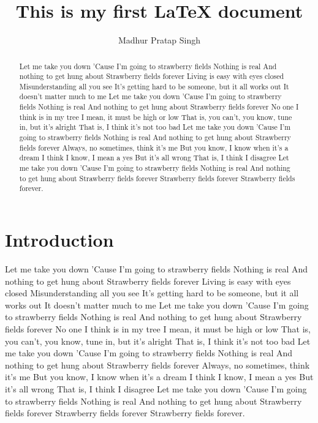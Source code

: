 \documentclass[12pt]{article}
\title{This is my first LaTeX document}
\author{Madhur Pratap Singh}
\begin{document}
\maketitle

\begin{abstract}
Let me take you down
'Cause I'm going to strawberry fields
Nothing is real
And nothing to get hung about
Strawberry fields forever
Living is easy with eyes closed
Misunderstanding all you see
It's getting hard to be someone, but it all works out
It doesn't matter much to me
Let me take you down
'Cause I'm going to strawberry fields
Nothing is real
And nothing to get hung about
Strawberry fields forever
No one I think is in my tree
I mean, it must be high or low
That is, you can't, you know, tune in, but it's alright
That is, I think it's not too bad
Let me take you down
'Cause I'm going to strawberry fields
Nothing is real
And nothing to get hung about
Strawberry fields forever
Always, no sometimes, think it's me
But you know, I know when it's a dream
I think I know, I mean a yes
But it's all wrong
That is, I think I disagree
Let me take you down
'Cause I'm going to strawberry fields
Nothing is real
And nothing to get hung about
Strawberry fields forever
Strawberry fields forever
Strawberry fields forever.
\end{abstract}

\section{Introduction}
Let me take you down
'Cause I'm going to strawberry fields
Nothing is real
And nothing to get hung about
Strawberry fields forever
Living is easy with eyes closed
Misunderstanding all you see
It's getting hard to be someone, but it all works out
It doesn't matter much to me
Let me take you down
'Cause I'm going to strawberry fields
Nothing is real
And nothing to get hung about
Strawberry fields forever
No one I think is in my tree
I mean, it must be high or low
That is, you can't, you know, tune in, but it's alright
That is, I think it's not too bad
Let me take you down
'Cause I'm going to strawberry fields
Nothing is real
And nothing to get hung about
Strawberry fields forever
Always, no sometimes, think it's me
But you know, I know when it's a dream
I think I know, I mean a yes
But it's all wrong
That is, I think I disagree
Let me take you down
'Cause I'm going to strawberry fields
Nothing is real
And nothing to get hung about
Strawberry fields forever
Strawberry fields forever
Strawberry fields forever.
\end{document}
